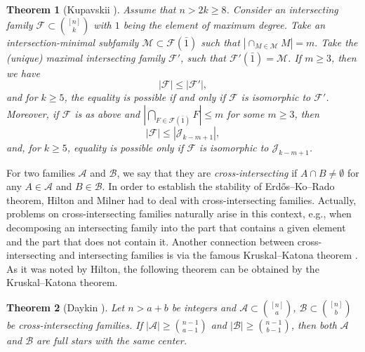 \documentclass[11pt]{article}
\newcommand{\m}{\mathcal}
\newtheorem{theorem}{Theorem}[section]
\begin{document}
\begin{theorem}[Kupavskii \cite{Kup2018, 11-23-2}]\label{11-23-2}
Assume that \( n > 2k \geq 8 \). Consider an intersecting family \( \mathcal{F} \subset \binom{[n]}{k} \) with $1$ being the element of maximum degree. Take an intersection-minimal subfamily \( \mathcal{M} \subset \mathcal{F}(\bar{1}) \) such that
$| \cap_{M \in \mathcal{M}} M | = m.
$
Take the (unique) maximal intersecting family \( \mathcal{F}' \), such that \( \mathcal{F}'(\bar{1}) = \mathcal{M} \). If \( m \geq 3 \), then we have
\[
|\mathcal{F}| \leq |\mathcal{F}'|,
\]
and for \( k \geq 5 \), the equality is possible if and only if \( \mathcal{F} \) is isomorphic to \( \mathcal{F}' \). Moreover, if \( \mathcal{F} \) is as above and
$|\bigcap_{F \in \mathcal{F}(\bar{1})} F| \leq m
$
for some \( m \geq 3 \), then
\begin{equation} \label{eq-Kup-more}
|\mathcal{F}| \leq |\m J_{k-m+1}|,
\end{equation}
and, for \( k \geq 5 \), equality is possible only if \( \mathcal{F} \) is isomorphic to \( \m J_{k-m+1} \).
\end{theorem}



 For two families $\m A$ and $ \m B$, we say that they are {\it cross-intersecting} if $A\cap B\ne \emptyset$ for any $A\in \m A$ and $B\in \m B$.  
In order to establish the stability of Erd\H{o}s--Ko--Rado theorem, Hilton and Milner \cite{HM1967} had to deal with cross-intersecting families. Actually, problems on cross-intersecting families naturally arise in this context, e.g., when decomposing an intersecting family into the part that contains a given element and the part that does not contain it. Another connection between cross-intersecting and intersecting families is via the famous Kruskal--Katona theorem \cite{12-1-2, 12-1-3}. As it was noted by Hilton, 
the following theorem can be obtained by the Kruskal--Katona theorem. 


\begin{theorem}[Daykin \cite{Day1973}]
    Let $n > a+b$ be integers and 
$\m A\subset {[n]\choose a}$, $\m B\subset {[n]\choose b}$ be cross-intersecting families. 
If $|\m A|\ge {n-1\choose a-1}$ and $|\m B| \ge {n-1\choose b-1}$, 
then both $\mathcal{A}$ and $\m B$ are full stars with the same center. 
\end{theorem}
\end{document}
